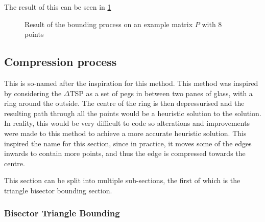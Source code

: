 \documentclass[11pt]{article}
\newcommand{\dtsp}{$\Delta$TSP }
\begin{document}
The result of this can be seen in \cref{plt:example_bounded}

\begin{figure}[t]
\begin{center}
\end{center}
	\caption{Result of the bounding process on an example matrix $P$ with 8 points}\label{plt:example_bounded}
\end{figure}

\subsection{Compression process}
This is so-named after the inspiration for this method. This method was inspired by considering the \dtsp as a set of pegs in between two panes of glass, with a ring around the outside. The centre of the ring is then depressurised and the resulting path through all the points would be a heuristic solution to the solution. In reality, this would be very difficult to code so alterations and improvements were made to this method to achieve a more accurate heuristic solution. This inspired the name for this section, since in practice, it moves some of the edges inwards to contain more points, and thus the edge is compressed towards the centre.

This section can be split into multiple sub-sections, the first of which is the triangle bisector bounding section.

\subsubsection{Bisector Triangle Bounding}
\end{document}
